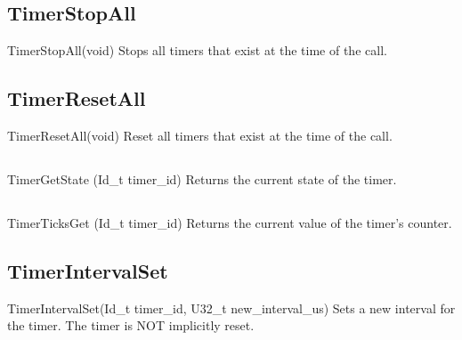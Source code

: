 \subsection{TimerStopAll}
\label{func:TimerStopAll}
\begin{pdfunction}
{TimerStopAll(void) }
{ 
Stops all timers that exist at the time of the call. }
\end{pdfunction}

\subsection{TimerResetAll}
\label{func:TimerResetAll}
\begin{pdfunction}
{TimerResetAll(void) }
{ 
Reset all timers that exist at the time of the call. }
\end{pdfunction}

\subsection{}
\label{func:}
\begin{pdfunction}
{TimerGetState (Id\_t timer\_id) }
{ 
Returns the current state of the timer. }
\end{pdfunction}

\subsection{}
\label{func:}
\begin{pdfunction}
{TimerTicksGet (Id\_t timer\_id) }
{ 
Returns the current value of the timer's counter. }
\end{pdfunction}

\subsection{TimerIntervalSet}
\label{func:TimerIntervalSet}
\begin{pdfunction}
{TimerIntervalSet(Id\_t timer\_id, U32\_t new\_interval\_us) }
{ 
Sets a new interval for the timer. The timer is NOT implicitly 
reset.}
\end{pdfunction}

